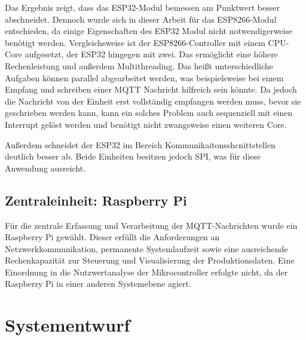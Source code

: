 Das Ergebnis zeigt, dass das ESP32-Modul bemessen am Punktwert besser abschneidet. Dennoch wurde sich in dieser Arbeit für das ESP8266-Modul entschieden, da einige Eigenschaften des ESP32 Modul nicht notwendigerweise benötigt werden. Vergleichsweise ist der ESP8266-Controller mit einem CPU-Core aufgesetzt, der ESP32 hingegen mit zwei. Das ermöglicht eine höhere Rechenleistung und außerdem Multithreading. Das heißt unterschiedliche Aufgaben können parallel abgearbeitet werden, was beispielsweise bei einem Empfang und schreiben einer MQTT Nachricht hilfreich sein könnte. Da jedoch die Nachricht von der Einheit erst vollständig empfangen werden muss, bevor sie geschrieben werden kann, kann ein solches Problem auch sequenziell mit einen Interrupt gelöst werden und benötigt nicht zwangsweise einen weiteren Core. 

Außerdem schneidet der ESP32 im Bereich Kommunikaitonsshcnittstellen deutlich besser ab. Beide Einheiten besitzen jedoch SPI, was für diese Anwendung ausreicht.


\subsection{Zentraleinheit: Raspberry Pi}

Für die zentrale Erfassung und Verarbeitung der MQTT-Nachrichten wurde ein Raspberry Pi gewählt. Dieser erfüllt die Anforderungen an Netzwerkkommunikation, permanente Systemlaufzeit sowie eine ausreichende Rechenkapazität zur Steuerung und Visualisierung der Produktionsdaten. Eine Einordnung in die Nutzwertanalyse der Mikrocontroller erfolgte nicht, da der Raspberry Pi in einer anderen Systemebene agiert.



\section{Systementwurf}
\label{sec:systementwurf}
